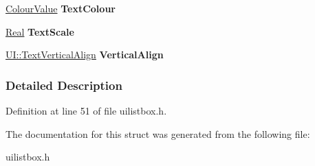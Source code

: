 \begin{DoxyCompactItemize}
\item 
\hypertarget{structMezzanine_1_1UI_1_1TemplateParams_a1cd7c958d384cf3fcf45caa6fe99ef4c}{
\hyperlink{classMezzanine_1_1ColourValue}{ColourValue} {\bfseries TextColour}}
\label{structMezzanine_1_1UI_1_1TemplateParams_a1cd7c958d384cf3fcf45caa6fe99ef4c}

\item 
\hypertarget{structMezzanine_1_1UI_1_1TemplateParams_aaee60f39f62008f357f9a6e37df6e4d0}{
\hyperlink{namespaceMezzanine_a726731b1a7df72bf3583e4a97282c6f6}{Real} {\bfseries TextScale}}
\label{structMezzanine_1_1UI_1_1TemplateParams_aaee60f39f62008f357f9a6e37df6e4d0}

\item 
\hypertarget{structMezzanine_1_1UI_1_1TemplateParams_aa0388d1810402263c63145a94d2b405a}{
\hyperlink{namespaceMezzanine_1_1UI_ab35e3845e2541698245262cc17147ae9}{UI::TextVerticalAlign} {\bfseries VerticalAlign}}
\label{structMezzanine_1_1UI_1_1TemplateParams_aa0388d1810402263c63145a94d2b405a}

\end{DoxyCompactItemize}


\subsubsection{Detailed Description}


Definition at line 51 of file uilistbox.h.



The documentation for this struct was generated from the following file:\begin{DoxyCompactItemize}
\item 
uilistbox.h\end{DoxyCompactItemize}
